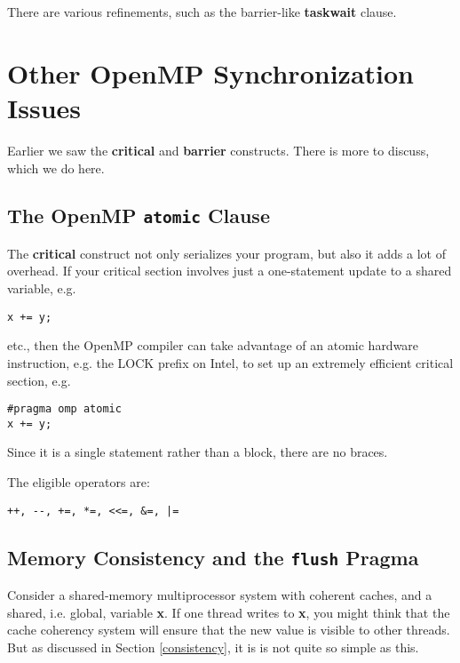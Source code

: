 There are various refinements, such as the barrier-like {\bf taskwait}
clause.

\section{Other OpenMP Synchronization Issues}

Earlier we saw the {\bf critical} and {\bf barrier} constructs.  There
is more to discuss, which we do here.

\subsection{The OpenMP {\tt atomic} Clause}

The {\bf critical} construct not only serializes your program, but also
it adds a lot of overhead.  If your critical section involves just a
one-statement update to a shared variable, e.g.

\begin{Verbatim}[fontsize=\relsize{-2}]
x += y;
\end{Verbatim}

etc., then the OpenMP compiler can take advantage of an atomic hardware
instruction, e.g. the LOCK prefix on Intel, to set up an extremely efficient
critical section, e.g.

\begin{Verbatim}[fontsize=\relsize{-2}]
#pragma omp atomic
x += y;
\end{Verbatim}

Since it is a single statement rather than a block, there are no
braces.

The eligible operators are:

\begin{Verbatim}[fontsize=\relsize{-2}]
++, --, +=, *=, <<=, &=, |=
\end{Verbatim}

\subsection{Memory Consistency and the {\tt flush} Pragma}

Consider a shared-memory multiprocessor system with coherent caches, and
a shared, i.e. global, variable {\bf x}.  If one thread writes to {\bf
x}, you might think that the cache coherency system will ensure that the
new value is visible to other threads.  But as discussed in Section
\ref{consistency}, it is is not quite so simple as this.

